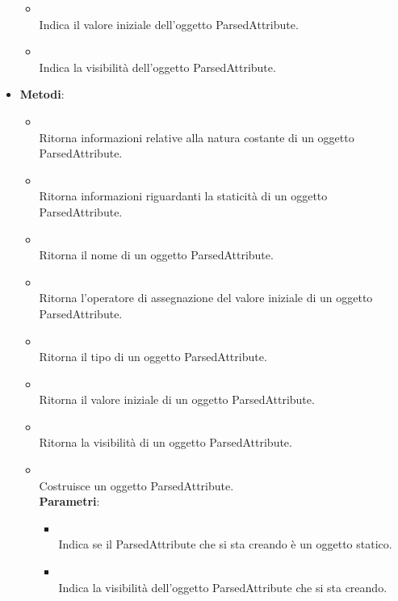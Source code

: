 \begin{itemize}
\begin{itemize}
\item {}
\\ Indica il valore iniziale dell'oggetto ParsedAttribute.
\item {}
\\ Indica la visibilità dell'oggetto ParsedAttribute.
\end{itemize}
\item \textbf{Metodi}:
\begin{itemize}
\item {}
\\ Ritorna informazioni relative alla natura costante di un oggetto ParsedAttribute.
\item {}
\\ Ritorna informazioni riguardanti la staticità di un oggetto ParsedAttribute.
\item {}
\\ Ritorna il nome di un oggetto ParsedAttribute.
\item {}
\\ Ritorna l'operatore di assegnazione del valore iniziale di un oggetto ParsedAttribute.
\item {}
\\ Ritorna il tipo di un oggetto ParsedAttribute.
\item {}
\\ Ritorna il valore iniziale di un oggetto ParsedAttribute.
\item {}
\\ Ritorna la visibilità di un oggetto ParsedAttribute.
\item {}
\\ Costruisce un oggetto ParsedAttribute.
\\ \textbf{Parametri}:
\begin{itemize}
\item {}
\\ Indica se il ParsedAttribute che si sta creando è un oggetto statico.
\item {}
\\ Indica la visibilità dell'oggetto ParsedAttribute che si sta creando.

\end{itemize}
\end{itemize}
\end{itemize}
